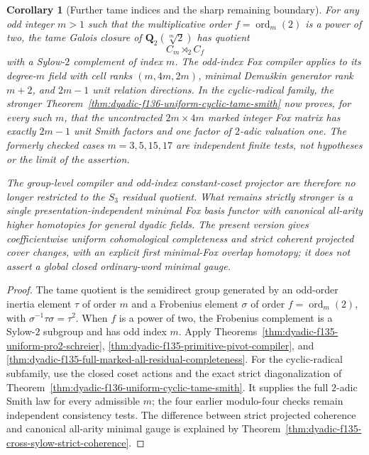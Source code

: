\documentclass[11pt]{article}
\newtheorem{corollary}[theorem]{Corollary}
\theoremstyle{definition}
\begin{document}
\begin{corollary}[Further tame indices and the sharp remaining boundary]
\label{cor:dyadic-f135-tame-indices-and-scope}
For any odd
integer $m>1$
such that
the multiplicative
order
$f=\operatorname{ord}_m(2)$
is a power of two,
the tame
Galois closure
of
$\mathbf Q_2(\sqrt[m]2)$
has quotient
\[
C_m\rtimes_2 C_f
\]
with a Sylow-$2$
complement of
index $m$.
The odd-index
Fox compiler
applies to its
degree-$m$
field with
cell ranks
$(m,4m,2m)$,
minimal Demu\v{s}kin
generator rank
$m+2$, and
$2m-1$
unit relation
directions.
In the cyclic-radical
family, the stronger
Theorem~\ref{thm:dyadic-f136-uniform-cyclic-tame-smith}
now proves, for
\emph{every} such
$m$, that the
uncontracted
$2m\times4m$
marked integer
Fox matrix has
exactly $2m-1$
unit Smith factors
and one factor of
$2$-adic valuation
one.  The formerly
checked cases
$m=3,5,15,17$
are independent
finite tests,
not hypotheses
or the limit
of the assertion.

The group-level
compiler and
odd-index
constant-coset
projector are
therefore no
longer restricted
to the $S_3$
residual quotient.
What remains
\emph{strictly
stronger} is
a single
presentation-independent
minimal Fox
basis functor
with canonical
all-arity
higher homotopies
for general
dyadic fields.
The present
version gives
coefficientwise
uniform
cohomological
completeness
and strict
coherent
\emph{projected}
cover changes,
with an explicit
first
minimal-Fox
overlap homotopy;
it does not
assert a global
closed ordinary-word
minimal gauge.
\end{corollary}

\begin{proof}
The tame
quotient is the
semidirect
group generated
by an odd-order
inertia element
$\tau$ of order
$m$ and a
Frobenius element
$\sigma$ of
order
$f=\operatorname{ord}_m(2)$,
with
$\sigma^{-1}\tau
\sigma=\tau^2$.
When $f$ is a
power of two,
the Frobenius
complement is
a Sylow-$2$
subgroup and
has odd index $m$.
Apply
Theorems~\ref{thm:dyadic-f135-uniform-pro2-schreier},
\ref{thm:dyadic-f135-primitive-pivot-compiler},
and
\ref{thm:dyadic-f135-full-marked-all-residual-completeness}.
For the cyclic-radical
subfamily, use the
closed coset actions
and the exact strict
diagonalization of
Theorem~\ref{thm:dyadic-f136-uniform-cyclic-tame-smith}.
It supplies the
full $2$-adic Smith
law for every
admissible $m$;
the four earlier
modulo-four checks
remain independent
consistency tests.
The difference
between
strict projected
coherence and
canonical all-arity
minimal gauge
is explained by
Theorem~\ref{thm:dyadic-f135-cross-sylow-strict-coherence}.
\end{proof}
\end{document}
